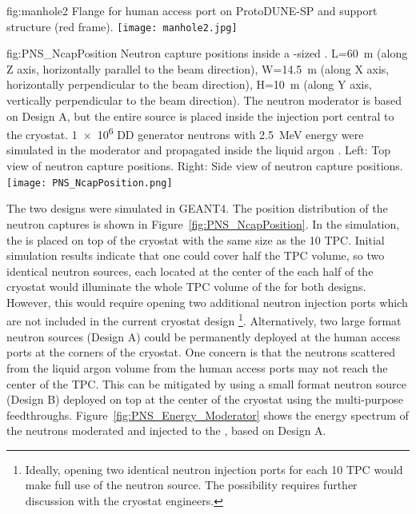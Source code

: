 \begin{dunefigure}{fig:manhole2}
{Flange for human access port on ProtoDUNE-SP and support structure (red frame).}
\texttt{[image: manhole2.jpg]}
\end{dunefigure}


\begin{dunefigure}{fig:PNS_NcapPosition}
{Neutron capture positions inside a -sized . L=\SI{60}{\m} (along Z axis, horizontally parallel to the beam direction), W=\SI{14.5}{\m} (along X axis, horizontally perpendicular to the beam direction), H=\SI{10}{\m} (along Y axis, vertically perpendicular to the beam direction). The neutron moderator is based on Design A, but the entire source is placed inside the injection port central to the cryostat. \num{1e6} DD generator neutrons with \SI{2.5}{\MeV} energy were simulated in the moderator and propagated inside the liquid argon . Left: Top view of neutron capture positions. Right: Side view of neutron capture positions.}
\texttt{[image: PNS\_NcapPosition.png]}
\end{dunefigure}




The two designs were simulated in GEANT4. The position distribution of the neutron captures is shown in Figure~\ref{fig:PNS_NcapPosition}. In the simulation, the  is placed on top of the cryostat with the same size as the  \SI{10}{\kton} TPC. Initial simulation results indicate that one  could cover half the TPC volume, so two identical neutron sources, each located at the center of the each half of the cryostat
would illuminate the whole TPC volume of the   for both designs. However, this would require opening two additional neutron injection ports which are not included in the current cryostat design \footnote{Ideally, opening two identical neutron injection ports for each \SI{10}{\kton} TPC would make full use of the neutron source. The possibility requires further discussion with the cryostat engineers.}. Alternatively, two large format neutron sources (Design A) could be permanently deployed at the human access ports at the corners of the cryostat. One concern is that the neutrons scattered from the liquid argon volume from the human access ports may not reach the center of the TPC. This can be mitigated by using a small format neutron source (Design B) deployed on top at the center of the cryostat using the multi-purpose feedthroughs. %
Figure~\ref{fig:PNS_Energy_Moderator} shows the energy spectrum of the neutrons moderated and injected to the , based on Design A.

